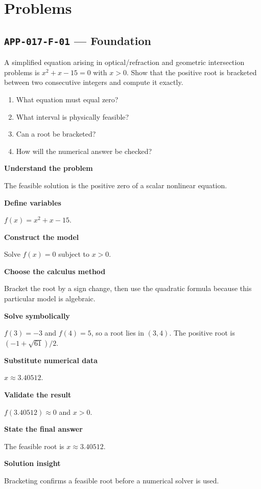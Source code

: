 \documentclass[11pt]{book}
\newcommand{\pid}[1]{\texttt{#1}}
\begin{document}
\section*{Problems}
\subsection*{\pid{APP-017-F-01} — Foundation}
\begin{problembox}
A simplified equation arising in optical/refraction and geometric intersection problems is $x^2+x-15=0$ with $x>0$. Show that the positive root is bracketed between two consecutive integers and compute it exactly.
\end{problembox}
\begin{promptbox}\begin{enumerate}
\item What equation must equal zero?
\item What interval is physically feasible?
\item Can a root be bracketed?
\item How will the numerical answer be checked?
\end{enumerate}\end{promptbox}
\begin{solutionbox}
\textbf{Understand the problem}\par The feasible solution is the positive zero of a scalar nonlinear equation.\par\medskip
\textbf{Define variables}\par $f(x)=x^2+x-15$.\par\medskip
\textbf{Construct the model}\par Solve $f(x)=0$ subject to $x>0$.\par\medskip
\textbf{Choose the calculus method}\par Bracket the root by a sign change, then use the quadratic formula because this particular model is algebraic.\par\medskip
\textbf{Solve symbolically}\par $f(3)=-3$ and $f(4)=5$, so a root lies in $(3,4)$. The positive root is $(-1+\sqrt{61})/2$.\par\medskip
\textbf{Substitute numerical data}\par $x\approx 3.40512$.\par\medskip
\textbf{Validate the result}\par $f(3.40512)\approx 0$ and $x>0$.\par\medskip
\textbf{State the final answer}\par The feasible root is $x\approx 3.40512$.\par\medskip
\textbf{Solution insight}\par Bracketing confirms a feasible root before a numerical solver is used.\par\medskip
\end{solutionbox}
\end{document}
